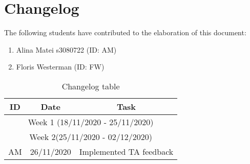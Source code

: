 \section{Changelog}

The following students have contributed to the elaboration of this document:
\begin{enumerate}
     \item Alina Matei s3080722 (ID: AM)
    \item Floris Westerman (ID: FW)
\end{enumerate}
   
\begin{table}[H]
    \centering
    \begin{tabular}{c|c|c}
        ID & Date & Task  \\
        \hline \hline
        \multicolumn{3}{c}{Week 1 (18/11/2020 - 25/11/2020)}\\
        \hline
        \multicolumn{3}{c}{Week 2(25/11/2020 - 02/12/2020)}\\
        \hline
        AM & 26/11/2020 & Implemented TA feedback 
    \end{tabular}
    \caption{Changelog table}
    \label{tab:changelog}
\end{table}